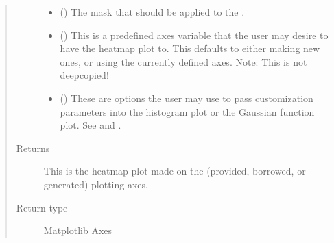 \documentclass[letterpaper,10pt,english]{sphinxmanual}
\begin{document}
\begin{fulllineitems}
\begin{quote}
\begin{description}
\begin{itemize}
\item {} 
 (\sphinxstyleliteralemphasis{\sphinxupquote{ (}}\sphinxstyleliteralemphasis{\sphinxupquote{)}}) \textendash{} The mask that should be applied to the .

\item {} 
 (\sphinxstyleliteralemphasis{\sphinxupquote{ (}}\sphinxstyleliteralemphasis{\sphinxupquote{)}}) \textendash{} This is a predefined axes variable that the user may desire
to have the heat\sphinxhyphen{}map plot to. This defaults to either making
new ones, or using the currently defined axes. Note: This
is not deep\sphinxhyphen{}copied!

\item {} 
 (\sphinxstyleliteralemphasis{\sphinxupquote{ (}}\sphinxstyleliteralemphasis{\sphinxupquote{)}}) \textendash{} These are options the user may use to pass customization
parameters into the histogram plot or the Gaussian function
plot.
See  and
.

\end{itemize}

\item[{Returns}] \leavevmode
{} \textendash{} This is the heatmap plot made on the (provided, borrowed, or
generated) plotting axes.

\item[{Return type}] \leavevmode
Matplotlib Axes

\end{description}\end{quote}

\end{fulllineitems}

\end{document}
